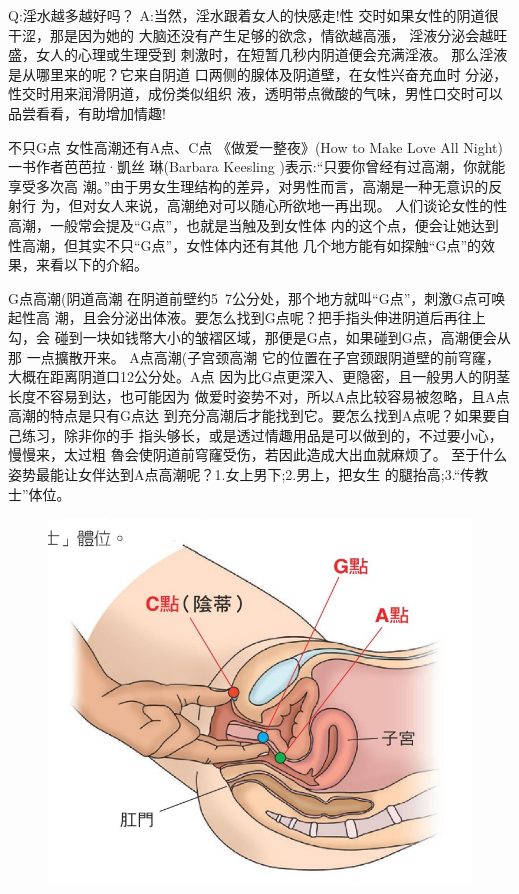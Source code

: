 \documentclass[12pt,UTF8]{ctexbook}
\begin{document}
Q:淫水越多越好吗？
A:当然，淫水跟着女人的快感走!性
交时如果女性的阴道很干涩，那是因为她的
大脑还没有产生足够的欲念，情欲越高漲，
淫液分泌会越旺盛，女人的心理或生理受到
刺激时，在短暂几秒内阴道便会充满淫液。
那么淫液是从哪里来的呢？它来自阴道
口两侧的腺体及阴道壁，在女性兴奋充血时
分泌，性交时用来润滑阴道，成份类似组织
液，透明带点微酸的气味，男性口交时可以
品尝看看，有助增加情趣!

不只G点
女性高潮还有A点、C点
《做爱一整夜》(How to Make Love All Night)一书作者芭芭拉·凱丝
琳(Barbara Keesling )表示:“只要你曾经有过高潮，你就能享受多次高
潮。”由于男女生理结构的差异，对男性而言，高潮是一种无意识的反射行
为，但对女人来说，高潮绝对可以随心所欲地一再出现。
人们谈论女性的性高潮，一般常会提及“G点”，也就是当触及到女性体
内的这个点，便会让她达到性高潮，但其实不只“G点”，女性体内还有其他
几个地方能有如探触“G点”的效果，来看以下的介紹。

G点高潮(阴道高潮
在阴道前壁约5~7公分处，那个地方就叫“G点”，刺激G点可唤起性高
潮，且会分泌出体液。要怎么找到G点呢？把手指头伸进阴道后再往上勾，会
碰到一块如钱幣大小的皱褶区域，那便是G点，如果碰到G点，高潮便会从那
一点擴散开来。
A点高潮(子宫颈高潮
它的位置在子宫颈跟阴道壁的前穹窿，大概在距离阴道口12公分处。A点
因为比G点更深入、更隐密，且一般男人的阴茎长度不容易到达，也可能因为
做爱时姿势不对，所以A点比较容易被忽略，且A点高潮的特点是只有G点达
到充分高潮后才能找到它。要怎么找到A点呢？如果要自己练习，除非你的手
指头够长，或是透过情趣用品是可以做到的，不过要小心，慢慢来，太过粗
魯会使阴道前穹窿受伤，若因此造成大出血就麻烦了。
至于什么姿势最能让女伴达到A点高潮呢？1.女上男下;2.男上，把女生
的腿抬高;3.“传教士”体位。

\begin{figure}[htbp]
	\centering
	\includegraphics[width=0.7\linewidth]{16}
	\caption{}
	\label{fig:1}
\end{figure}
\end{document}
